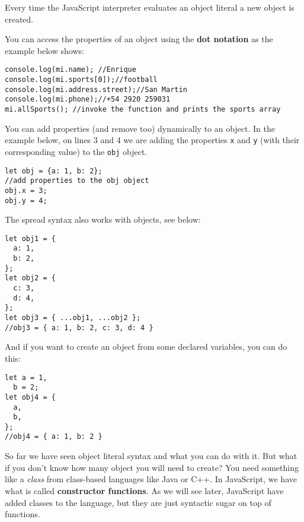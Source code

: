 \documentclass[a4paper, oneside, titlepage, 12pt]{book}
\begin{document}
Every time the JavaScript interpreter evaluates an object literal a new object is created. 

You can access the properties of an object using the \textbf{dot notation} as the example below shows:

\begin{verbatim}
console.log(mi.name); //Enrique
console.log(mi.sports[0]);//football
console.log(mi.address.street);//San Martin
console.log(mi.phone);//+54 2920 259031
mi.allSports(); //invoke the function and prints the sports array               
\end{verbatim}

You can add properties (and remove too) dynamically to an object. In the example below, on lines 3 and 4 we are adding the properties \texttt{x} and \texttt{y} (with their corresponding value) to the \texttt{obj} object.

\begin{verbatim}
let obj = {a: 1, b: 2};
//add properties to the obj object
obj.x = 3;
obj.y = 4;
\end{verbatim}

The spread syntax also works with objects, see below:

\begin{verbatim}
let obj1 = {
  a: 1,
  b: 2,
};
let obj2 = {
  c: 3,
  d: 4,
};
let obj3 = { ...obj1, ...obj2 };
//obj3 = { a: 1, b: 2, c: 3, d: 4 }
\end{verbatim}

And if you want to create an object from some declared variables, you can do this:

\begin{verbatim}
let a = 1,
  b = 2;
let obj4 = {
  a,
  b,
};
//obj4 = { a: 1, b: 2 }	
\end{verbatim}

So far we have seen object literal syntax and what you can do with it. But what if you don't know how many object you will need to create? You need something like a \textit{class} from class-based languages like Java or C++. In JavaScript, we have what is called \textbf{constructor functions}. As we will see later, JavaScript have added classes to the language, but they are just syntactic sugar on top of functions.
\end{document}
